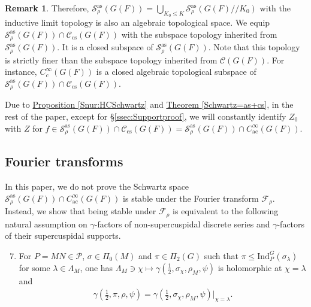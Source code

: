 \documentclass[10pt]{amsart}
\theoremstyle{definition}
\newtheorem{remark}[theorem]{Remark}
\numberwithin{equation}{section}
\numberwithin{equation}{subsection}
\newcommand{\Ind}{\mathrm{Ind}}
\begin{document}
\begin{remark}
Therefore, $\mathcal{S}_{\rho}^{\mathrm{as}}(G(F))=\bigcup_{K_0\le K} \mathcal{S}_\rho^{\mathrm{as}}(G(F)/\!/K_0)$ with the inductive limit topology is also an algebraic topological space. We equip $\mathcal{S}_\rho^{\mathrm{as}}(G(F))\cap \mathcal{C}_{\mathrm{cs}}(G(F))$ with the subspace topology inherited from $\mathcal{S}_{\rho}^{\mathrm{as}}(G(F))$. It is a closed subspace of $\mathcal{S}_{\rho}^{\mathrm{as}}(G(F))$. Note that this topology is strictly finer than the subspace topology inherited from $\mathcal{C}(G(F)).$ For instance, $C^\infty_c(G(F))$ is a closed algebraic topological subspace of $\mathcal{S}_\rho^{\mathrm{as}}(G(F))\cap \mathcal{C}_{\mathrm{cs}}(G(F)).$
\end{remark}

Due to \hyperref[Snur:HCSchwartz]{Proposition \ref{Snur:HCSchwartz}} and \hyperref[Schwartz=as+cs]{Theorem \ref{Schwartz=as+cs}}, in the rest of the paper, except for \S \ref{ssec:Supportproof}, we will constantly identify $Z_0$ with $Z$ for $f\in \mathcal{S}_{\rho}^{\mathrm{as}}(G(F))\cap  \mathcal{C}_{\mathrm{cs}}(G(F))=\mathcal{S}_\rho^{\mathrm{as}}(G(F))\cap C^\infty_{\mathrm{ac}}(G(F))$. 


\subsection{Fourier transforms}

In this paper, we do not prove the Schwartz space $\mathcal{S}_\rho^{\mathrm{as}}(G(F))\cap C^\infty_{\mathrm{ac}}(G(F))$ is stable under the Fourier transform $\mathcal{F}_\rho$. Instead, we show that being stable under $\mathcal{F}_\rho$ is equivalent to the following natural assumption on $\gamma$-factors of non-supercuspidal discrete series and $\gamma$-factors of their supercuspidal supports.


\begin{enumerate}[label=(LLC\text{\arabic*}), ref=LLC\text{\arabic*}] \setcounter{enumi}{6}
    \item\label{LLC:gamma} For $P=MN\in\mathcal{P}$, $\sigma\in\Pi_0(M)$ and $\pi\in\Pi_2(G)$ such that $\pi\leq \Ind_P^G(\sigma_\lambda)$ for some $\lambda\in \Lambda_M$, one has $\Lambda_M\ni\chi\mapsto \gamma(\tfrac{1}{2},\sigma_\chi,\rho_M,\psi)$ is holomorphic at $\chi = \lambda$ and 
    \begin{align*}
        \gamma(\tfrac{1}{2},\pi,\rho,\psi) = \gamma(\tfrac{1}{2},\sigma_\chi,\rho_M,\psi)\vert_{\chi = \lambda}.
    \end{align*}
\end{enumerate}
\end{document}
